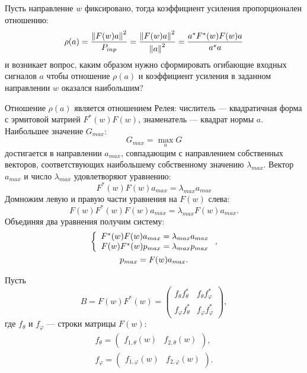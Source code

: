 Пусть направление $w$ фиксировано, тогда коэффициент усиления пропорционален отношению:
\begin{equation}
    \label{emission:gain:rayleigh}
    \rho(a)
    = \frac{\left \| F(w) a \right \|^2}{P_{inp}}
    = \frac{\left \| F(w) a \right \|^2}{\left \| a \right \|^2}
    = \frac{a^* F^*(w) F(w) a}{a^* a}
\end{equation}
и возникает вопрос, каким образом нужно сформировать огибающие входных сигналов $a$ чтобы отношение $\rho(a)$ и коэффициент усиления в заданном направлении $w$
оказался наибольшим?

Отношение $\rho(a)$ является отношением Релея: числитель --- квадратичная форма с эрмитовой матрией $F^*(w) F(w)$, знаменатель --- квадрат нормы $a$.
Наибольшее значение $G_{max}$:
\[
    G_{max} = \max \limits_{a} G
\]
достигается в направлении $a_{max}$, совпадающим с направлением собственных векторов, соответствующих наибольшему собственному значению $\lambda_{max}$.
Вектор $a_{max}$ и число $\lambda_{max}$ удовлетворяют уравнению:
\[
    F^*(w) F(w) a_{max} = \lambda_{max} a_{max}
\]
Домножим левую и правую части уравнения на $F(w)$ слева:
\[
    F(w) F^*(w) F(w) a_{max} = \lambda_{max} F(w) a_{max} .
\]
Объединяя два уравнения получим систему:
\begin{gather}
    \left \{
    \begin{array}{c}
        F^*(w) F(w) a_{max} = \lambda_{max} a_{max} \\
        F(w) F^*(w) p_{max} = \lambda_{max} p_{max}
    \end{array}
    \right .
    \label{emission:emitter:gain:system}, \\
    p_{max} = F(w) a_{max} \notag.
\end{gather}

Пусть
\[
    B
    = F(w) F^*(w)
    = \begin{pmatrix}
          f_\theta f_\theta^*  & f_{\theta} f_\varphi^* \\
          f_\varphi f_\theta^* & f_\varphi f_\varphi^*
    \end{pmatrix} ,
\]
где $f_\theta$ и $f_\varphi$ --- строки матрицы $F(w)$:
\begin{gather*}
    f_\theta
    = \begin{pmatrix}
          f_{1,\theta}(w) & f_{2,\theta}(w)
    \end{pmatrix}, \\
    f_\varphi
    = \begin{pmatrix}
          f_{1,\varphi}(w) & f_{2,\varphi}(w)
    \end{pmatrix} .
\end{gather*}

